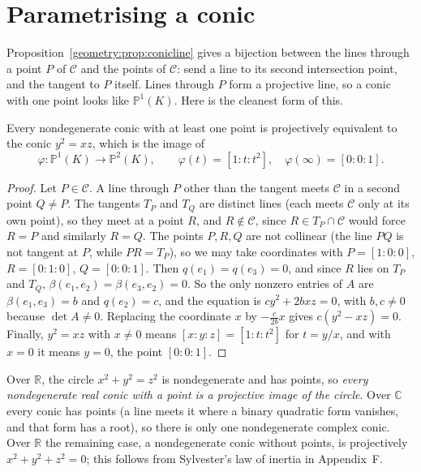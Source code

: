 \section{Parametrising a conic}

Proposition~\ref{geometry:prop:conicline} gives a bijection between the lines through a point $P$ of $\mathcal C$ and the points of $\mathcal C$: send a line to its
second intersection point, and the tangent to $P$ itself. Lines through $P$ form a projective line, so a conic with one point looks like
$\mathbb P^1(K)$. Here is the cleanest form of this.

\begin{theorem}\label{geometry:thm:normalform}
Every nondegenerate conic with at least one point is projectively equivalent to the conic $y^2=xz$, which is the image of
\[
\varphi:\mathbb P^1(K)\to\mathbb P^2(K),\qquad \varphi(t)=[1:t:t^2],\quad \varphi(\infty)=[0:0:1].
\]
\end{theorem}

\begin{proof}
Let $P\in\mathcal C$. A line through $P$ other than the tangent meets $\mathcal C$ in a second point $Q\ne P$. The tangents $T_P$ and $T_Q$ are distinct
lines (each meets $\mathcal C$ only at its own point), so they meet at a point $R$, and $R\notin\mathcal C$, since $R\in T_P\cap\mathcal C$ would force $R=P$
and similarly $R=Q$. The points $P,R,Q$ are not collinear (the line $PQ$ is not tangent at $P$, while $PR=T_P$), so we may take coordinates with
$P=[1:0:0]$, $R=[0:1:0]$, $Q=[0:0:1]$. Then $q(e_1)=q(e_3)=0$, and since $R$ lies on $T_P$ and $T_Q$, $\beta(e_1,e_2)=\beta(e_3,e_2)=0$. So the only
nonzero entries of $A$ are $\beta(e_1,e_3)=b$ and $q(e_2)=c$, and the equation is $cy^2+2bxz=0$, with $b,c\ne0$ because $\det A\ne0$. Replacing the
coordinate $x$ by $-\frac{c}{2b}x$ gives $c(y^2-xz)=0$. Finally, $y^2=xz$ with $x\ne0$ means $[x:y:z]=[1:t:t^2]$ for $t=y/x$, and with $x=0$ it means
$y=0$, the point $[0:0:1]$.
\end{proof}

Over $\mathbb R$, the circle $x^2+y^2=z^2$ is nondegenerate and has points, so \emph{every nondegenerate real conic with a point is a projective image
of the circle}. Over $\mathbb C$ every conic has points (a line meets it where a binary quadratic form vanishes, and that form has a root), so there is
only one nondegenerate complex conic. Over $\mathbb R$ the remaining case, a nondegenerate conic without points, is projectively $x^2+y^2+z^2=0$; this
follows from Sylvester's law of inertia in Appendix~F.

